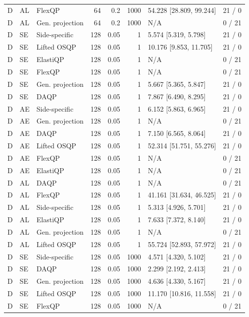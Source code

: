 \begin{longtable}{@{}lllrrrlr@{}}
D & AL & FlexQP & 64 & 0.2 & 1000 & 54.228 [28.809, 99.244] & 21 / 0 \\
D & AL & Gen. projection & 64 & 0.2 & 1000 & N/A & 0 / 21 \\
D & SE & Side-specific & 128 & 0.05 & 1 & 5.574 [5.319, 5.798] & 21 / 0 \\
D & SE & Lifted OSQP & 128 & 0.05 & 1 & 10.176 [9.853, 11.705] & 21 / 0 \\
D & SE & ElastiQP & 128 & 0.05 & 1 & N/A & 0 / 21 \\
D & SE & FlexQP & 128 & 0.05 & 1 & N/A & 0 / 21 \\
D & SE & Gen. projection & 128 & 0.05 & 1 & 5.667 [5.365, 5.847] & 21 / 0 \\
D & SE & DAQP & 128 & 0.05 & 1 & 7.867 [6.490, 8.295] & 21 / 0 \\
D & AE & Side-specific & 128 & 0.05 & 1 & 6.152 [5.863, 6.965] & 21 / 0 \\
D & AE & Gen. projection & 128 & 0.05 & 1 & N/A & 0 / 21 \\
D & AE & DAQP & 128 & 0.05 & 1 & 7.150 [6.565, 8.064] & 21 / 0 \\
D & AE & Lifted OSQP & 128 & 0.05 & 1 & 52.314 [51.751, 55.276] & 21 / 0 \\
D & AE & FlexQP & 128 & 0.05 & 1 & N/A & 0 / 21 \\
D & AE & ElastiQP & 128 & 0.05 & 1 & N/A & 0 / 21 \\
D & AL & DAQP & 128 & 0.05 & 1 & N/A & 0 / 21 \\
D & AL & FlexQP & 128 & 0.05 & 1 & 41.161 [31.634, 46.525] & 21 / 0 \\
D & AL & Side-specific & 128 & 0.05 & 1 & 5.313 [4.926, 5.701] & 21 / 0 \\
D & AL & ElastiQP & 128 & 0.05 & 1 & 7.633 [7.372, 8.140] & 21 / 0 \\
D & AL & Gen. projection & 128 & 0.05 & 1 & N/A & 0 / 21 \\
D & AL & Lifted OSQP & 128 & 0.05 & 1 & 55.724 [52.893, 57.972] & 21 / 0 \\
D & SE & Side-specific & 128 & 0.05 & 1000 & 4.571 [4.320, 5.102] & 21 / 0 \\
D & SE & DAQP & 128 & 0.05 & 1000 & 2.299 [2.192, 2.413] & 21 / 0 \\
D & SE & Gen. projection & 128 & 0.05 & 1000 & 4.636 [4.330, 5.167] & 21 / 0 \\
D & SE & Lifted OSQP & 128 & 0.05 & 1000 & 11.170 [10.816, 11.558] & 21 / 0 \\
D & SE & FlexQP & 128 & 0.05 & 1000 & N/A & 0 / 21 \\

\end{longtable}
